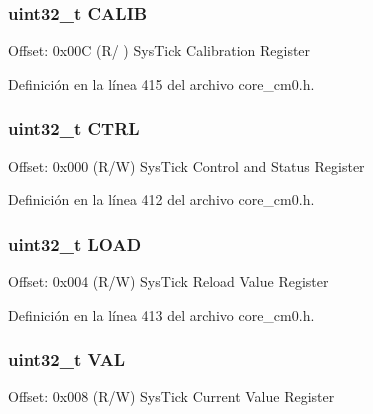 \subsubsection[{\texorpdfstring{C\+A\+L\+IB}{CALIB}}]{ uint32\+\_\+t C\+A\+L\+IB}\hypertarget{struct_sys_tick___type_a40e07d0a4638a676780713b6ceeec4ef}{}\label{struct_sys_tick___type_a40e07d0a4638a676780713b6ceeec4ef}
Offset\+: 0x00C (R/ ) Sys\+Tick Calibration Register 

Definición en la línea 415 del archivo core\+\_\+cm0.\+h.

\subsubsection[{\texorpdfstring{C\+T\+RL}{CTRL}}]{ uint32\+\_\+t C\+T\+RL}\hypertarget{struct_sys_tick___type_a15fc8d35f045f329b80c544bef35ff64}{}\label{struct_sys_tick___type_a15fc8d35f045f329b80c544bef35ff64}
Offset\+: 0x000 (R/W) Sys\+Tick Control and Status Register 

Definición en la línea 412 del archivo core\+\_\+cm0.\+h.

\subsubsection[{\texorpdfstring{L\+O\+AD}{LOAD}}]{ uint32\+\_\+t L\+O\+AD}\hypertarget{struct_sys_tick___type_aad9adf4efc940cddb8161b69cfbe19d3}{}\label{struct_sys_tick___type_aad9adf4efc940cddb8161b69cfbe19d3}
Offset\+: 0x004 (R/W) Sys\+Tick Reload Value Register 

Definición en la línea 413 del archivo core\+\_\+cm0.\+h.

\subsubsection[{\texorpdfstring{V\+AL}{VAL}}]{ uint32\+\_\+t V\+AL}\hypertarget{struct_sys_tick___type_a26fb318c3b0a0ec7f45daafd5f8799a3}{}\label{struct_sys_tick___type_a26fb318c3b0a0ec7f45daafd5f8799a3}
Offset\+: 0x008 (R/W) Sys\+Tick Current Value Register 

